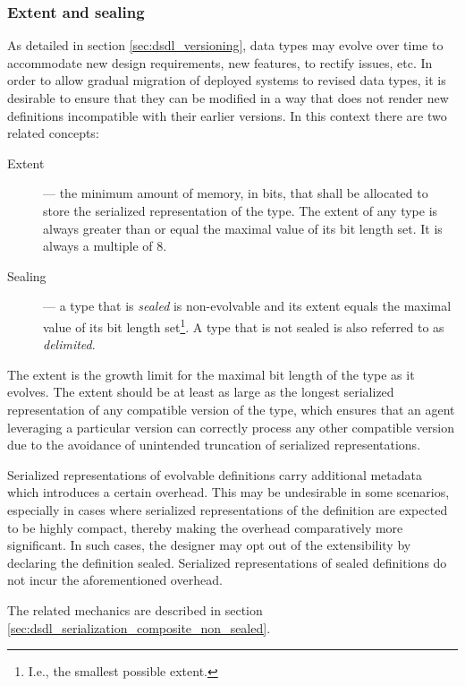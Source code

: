 \subsubsection{Extent and sealing}\label{sec:dsdl_composite_extent_and_sealing}

As detailed in section \ref{sec:dsdl_versioning},
data types may evolve over time to accommodate new design requirements, new features, to rectify issues, etc.
In order to allow gradual migration of deployed systems to revised data types,
it is desirable to ensure that they can be modified in a way that does not render new definitions
incompatible with their earlier versions.
In this context there are two related concepts:

\begin{description}
    \item[Extent] --- the minimum amount of memory, in bits, that shall be allocated to store the serialized
    representation of the type.
    The extent of any type is always greater than or equal the maximal value of its bit length set.
    It is always a multiple of 8.

    \item[Sealing] --- a type that is \emph{sealed} is non-evolvable and its extent equals the maximal value
    of its bit length set\footnote{%
        I.e., the smallest possible extent.
    }.
    A type that is not sealed is also referred to as \emph{delimited}.
\end{description}

The extent is the growth limit for the maximal bit length of the type as it evolves.
The extent should be at least as large as the longest serialized representation of any compatible version of the type,
which ensures that an agent leveraging a particular version can correctly process any other compatible
version due to the avoidance of unintended truncation of serialized representations.

Serialized representations of evolvable definitions carry additional metadata which introduces a certain overhead.
This may be undesirable in some scenarios, especially in cases where serialized representations of the
definition are expected to be highly compact, thereby making the overhead comparatively more significant.
In such cases, the designer may opt out of the extensibility by declaring the definition sealed.
Serialized representations of sealed definitions do not incur the aforementioned overhead.

The related mechanics are described in section \ref{sec:dsdl_serialization_composite_non_sealed}.

